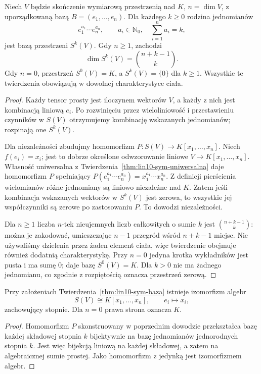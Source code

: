 \begin{twierdzenie}
\label{thm:lin10-sym-baza}
Niech \(V\) będzie skończenie
wymiarową przestrzenią nad \(K\),
\(n=\dim V\), z uporządkowaną
bazą \(B=(e_1,\ldots,e_n)\).
Dla każdego \(k\ge0\)
rodzina jednomianów
\[
 e_1^{a_1}\cdots e_n^{a_n},
 \qquad a_i\in\mathbb N_0,\quad
 \sum_{i=1}^n a_i=k,
\]
jest bazą przestrzeni \(S^k(V)\).
Gdy \(n\ge1\), zachodzi
\[
 \dim S^k(V)=\binom{n+k-1}{k}.
\]
Gdy \(n=0\), przestrzeń \(S^0(V)=K\),
a \(S^k(V)=\{0\}\) dla \(k\ge1\).
Wszystkie te twierdzenia obowiązują
w dowolnej charakterystyce ciała.
\end{twierdzenie}
\begin{proof}
Każdy tensor prosty jest iloczynem
wektorów \(V\), a każdy z nich
jest kombinacją liniową \(e_i\).
Po rozwinięciu przez wieloliniowość
i przestawieniu czynników w \(S(V)\)
otrzymujemy kombinację wskazanych
jednomianów; rozpinają one \(S^k(V)\).

Dla niezależności zbudujmy
homomorfizm
\(P\colon S(V)\to K[x_1,\ldots,x_n]\).
Niech \(f(e_i)=x_i\);
jest to dobrze określone
odwzorowanie liniowe \(V\to K[x_1,\ldots,x_n]\).
Własność uniwersalna
z Twierdzenia~\ref{thm:lin10-sym-uniwersalna}
daje homomorfizm \(P\)
spełniający
\(P(e_1^{a_1}\cdots e_n^{a_n})
=x_1^{a_1}\cdots x_n^{a_n}\).
Z definicji pierścienia
wielomianów różne jednomiany
są liniowo niezależne nad \(K\).
Zatem jeśli kombinacja wskazanych
wektorów w \(S^k(V)\) jest zerowa,
to wszystkie jej współczynniki
są zerowe po zastosowaniu \(P\).
To dowodzi niezależności.

Dla \(n\ge1\) liczba
\(n\)-tek nieujemnych liczb całkowitych
o sumie \(k\) jest
\(\binom{n+k-1}{k}\):
można je zakodować,
umieszczając \(n-1\) przegród
wśród \(n+k-1\) miejsc.
Nie używaliśmy dzielenia
przez żaden element ciała,
więc twierdzenie obejmuje
również dodatnią charakterystykę.
Przy \(n=0\) jedyna krotka
wykładników jest pusta
i ma sumę \(0\); daje
bazę \(S^0(V)=K\).
Dla \(k>0\) nie ma
żadnego jednomianu,
co zgodnie z rozpiętością
oznacza przestrzeń zerową.
\end{proof}

\begin{wniosek}
\label{cor:lin10-wielomiany}
Przy założeniach
Twierdzenia~\ref{thm:lin10-sym-baza}
istnieje izomorfizm algebr
\[
 S(V)\cong K[x_1,\ldots,x_n],
 \qquad e_i\longmapsto x_i,
\]
zachowujący stopnie.
Dla \(n=0\) prawa strona
oznacza \(K\).
\end{wniosek}
\begin{proof}
Homomorfizm \(P\) skonstruowany
w poprzednim dowodzie
przekształca bazę każdej
składowej stopnia \(k\)
bijektywnie na bazę jednomianów
jednorodnych stopnia \(k\).
Jest więc bijekcją liniową
na każdej składowej, a zatem
na algebraicznej sumie prostej.
Jako homomorfizm z jedynką
jest izomorfizmem algebr.
\end{proof}

